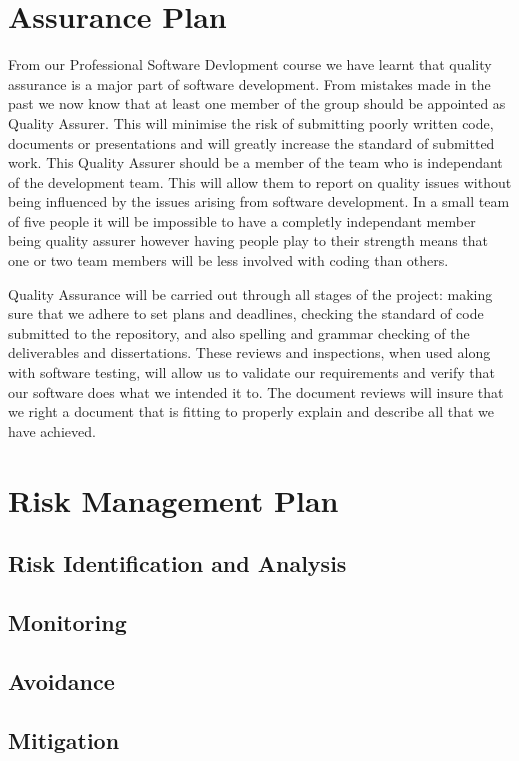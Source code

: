 \documentclass{l3proj}
\begin{document}
\section{Assurance Plan}
\label{sect:a-plan}                                                                               
From our Professional Software Devlopment course we have learnt that quality assurance is a major part of software development. From mistakes made in the past we now know that at least one member of the group should be appointed as Quality Assurer. This will minimise the risk of submitting poorly written code, documents or presentations and will greatly increase the standard of submitted work. This Quality Assurer should be a member of the team who is independant of the development team. This will allow them to report on quality issues without being influenced by the issues arising from software development. In a small team of five people it will be impossible to have a completly independant member being quality assurer however having people play to their strength means that one or two team members will be less involved with coding than others.

Quality Assurance will be carried out through all stages of the project: making sure that we adhere to set plans and deadlines, checking the standard of code submitted to the repository, and also spelling and grammar checking of the deliverables and dissertations.
These reviews and inspections, when used along with software testing, will allow us to validate our requirements and verify that our software does what we intended it to. The document reviews will insure that we right a document that is fitting to properly explain and describe all that we have achieved.

\section{Risk Management Plan}
\label{sect:risk-man}
\subsection{Risk Identification and Analysis} 
\subsection{Monitoring}
\subsection{Avoidance}
\subsection{Mitigation}
\end{document}
